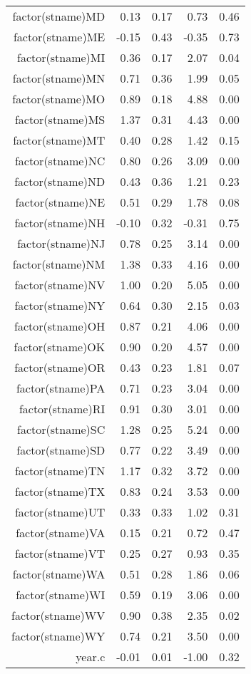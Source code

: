 \begin{table}[ht]
\begin{tabular}{rrrrr}
  factor(stname)MD & 0.13 & 0.17 & 0.73 & 0.46 \\ 
  factor(stname)ME & -0.15 & 0.43 & -0.35 & 0.73 \\ 
  factor(stname)MI & 0.36 & 0.17 & 2.07 & 0.04 \\ 
  factor(stname)MN & 0.71 & 0.36 & 1.99 & 0.05 \\ 
  factor(stname)MO & 0.89 & 0.18 & 4.88 & 0.00 \\ 
  factor(stname)MS & 1.37 & 0.31 & 4.43 & 0.00 \\ 
  factor(stname)MT & 0.40 & 0.28 & 1.42 & 0.15 \\ 
  factor(stname)NC & 0.80 & 0.26 & 3.09 & 0.00 \\ 
  factor(stname)ND & 0.43 & 0.36 & 1.21 & 0.23 \\ 
  factor(stname)NE & 0.51 & 0.29 & 1.78 & 0.08 \\ 
  factor(stname)NH & -0.10 & 0.32 & -0.31 & 0.75 \\ 
  factor(stname)NJ & 0.78 & 0.25 & 3.14 & 0.00 \\ 
  factor(stname)NM & 1.38 & 0.33 & 4.16 & 0.00 \\ 
  factor(stname)NV & 1.00 & 0.20 & 5.05 & 0.00 \\ 
  factor(stname)NY & 0.64 & 0.30 & 2.15 & 0.03 \\ 
  factor(stname)OH & 0.87 & 0.21 & 4.06 & 0.00 \\ 
  factor(stname)OK & 0.90 & 0.20 & 4.57 & 0.00 \\ 
  factor(stname)OR & 0.43 & 0.23 & 1.81 & 0.07 \\ 
  factor(stname)PA & 0.71 & 0.23 & 3.04 & 0.00 \\ 
  factor(stname)RI & 0.91 & 0.30 & 3.01 & 0.00 \\ 
  factor(stname)SC & 1.28 & 0.25 & 5.24 & 0.00 \\ 
  factor(stname)SD & 0.77 & 0.22 & 3.49 & 0.00 \\ 
  factor(stname)TN & 1.17 & 0.32 & 3.72 & 0.00 \\ 
  factor(stname)TX & 0.83 & 0.24 & 3.53 & 0.00 \\ 
  factor(stname)UT & 0.33 & 0.33 & 1.02 & 0.31 \\ 
  factor(stname)VA & 0.15 & 0.21 & 0.72 & 0.47 \\ 
  factor(stname)VT & 0.25 & 0.27 & 0.93 & 0.35 \\ 
  factor(stname)WA & 0.51 & 0.28 & 1.86 & 0.06 \\ 
  factor(stname)WI & 0.59 & 0.19 & 3.06 & 0.00 \\ 
  factor(stname)WV & 0.90 & 0.38 & 2.35 & 0.02 \\ 
  factor(stname)WY & 0.74 & 0.21 & 3.50 & 0.00 \\ 
  year.c & -0.01 & 0.01 & -1.00 & 0.32 \\ 
   \hline
\end{tabular}
\end{table}
